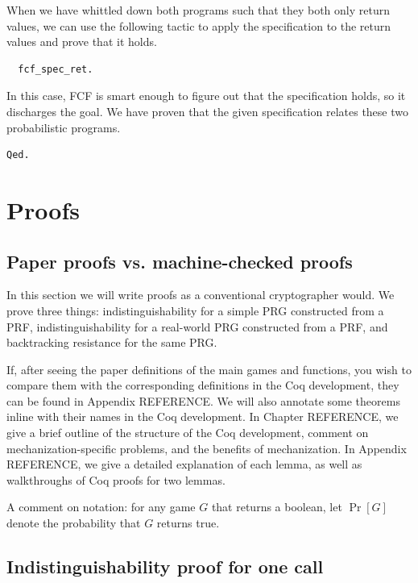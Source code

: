 \documentclass[12pt,lot, lof]{puthesis}
\begin{document}
{When we have whittled down both programs such that they both only return values, we can use the following tactic to apply the specification to the return values and prove that it holds. 

\begin{lstlisting}
  fcf_spec_ret.
\end{lstlisting}

In this case, FCF is smart enough to figure out that the specification holds, so it discharges the goal. We have proven that the given specification relates these two probabilistic programs. 

\begin{lstlisting}
Qed.
\end{lstlisting}



\chapter{Proofs} \label{sec:proofs}

\section{Paper proofs vs. machine-checked proofs} \label{sec:paper_proofs_vs_machine_checked_proofs}

In this section we will write proofs as a conventional cryptographer would. We prove three things: indistinguishability for a simple PRG constructed from a PRF, indistinguishability for a real-world PRG constructed from a PRF, and backtracking resistance for the same PRG.

If, after seeing the paper definitions of the main games and functions, you wish to compare them with the corresponding definitions in the Coq development, they can be found in Appendix REFERENCE. We will also annotate some theorems inline with their names in the Coq development. In Chapter REFERENCE, we give a brief outline of the structure of the Coq development, comment on mechanization-specific problems, and the benefits of mechanization. In Appendix REFERENCE, we give a detailed explanation of each lemma, as well as walkthroughs of Coq proofs for two lemmas.

A comment on notation: for any game $G$ that returns a boolean, let $\Pr[G]$ denote the probability that $G$ returns true. 

\section{Indistinguishability proof for one call} \label{sec:indistinguishability_proof_for_one_call}

}
\end{document}
